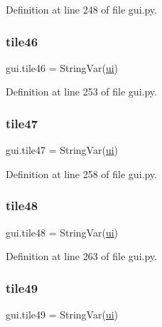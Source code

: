 Definition at line 248 of file gui.\+py.

\mbox{\label{namespacegui_a7121cbe6f2d65b30d9c5e3eedb79679b}} 
\subsubsection{\texorpdfstring{tile46}{tile46}}
{\footnotesize\ttfamily gui.\+tile46 = String\+Var(\mbox{\hyperlink{namespacegui_a40ab7281456eadbea2dc2038f5c24fa1}{ui}})}



Definition at line 253 of file gui.\+py.

\mbox{\label{namespacegui_a09c1aa53fc228e0b1f3645149832c496}} 
\subsubsection{\texorpdfstring{tile47}{tile47}}
{\footnotesize\ttfamily gui.\+tile47 = String\+Var(\mbox{\hyperlink{namespacegui_a40ab7281456eadbea2dc2038f5c24fa1}{ui}})}



Definition at line 258 of file gui.\+py.

\mbox{\label{namespacegui_a174b37164c4494cb221388aa7ceb65bc}} 
\subsubsection{\texorpdfstring{tile48}{tile48}}
{\footnotesize\ttfamily gui.\+tile48 = String\+Var(\mbox{\hyperlink{namespacegui_a40ab7281456eadbea2dc2038f5c24fa1}{ui}})}



Definition at line 263 of file gui.\+py.

\mbox{\label{namespacegui_a59285f7ea83c2953e86335c182b23524}} 
\subsubsection{\texorpdfstring{tile49}{tile49}}
{\footnotesize\ttfamily gui.\+tile49 = String\+Var(\mbox{\hyperlink{namespacegui_a40ab7281456eadbea2dc2038f5c24fa1}{ui}})}



